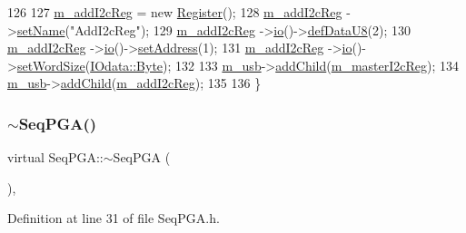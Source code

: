\begin{DoxyCode}
126 
127   \hyperlink{classSeqPGA_ac3a6aad3fec65ceb78528b6d20deeb3f}{m\_addI2cReg}       = \textcolor{keyword}{new} \hyperlink{classRegister}{Register}();
128   \hyperlink{classSeqPGA_ac3a6aad3fec65ceb78528b6d20deeb3f}{m\_addI2cReg}       ->\hyperlink{classObject_ae30fea75683c2d149b6b6d17c09ecd0c}{setName}(\textcolor{stringliteral}{"AddI2cReg"});
129   \hyperlink{classSeqPGA_ac3a6aad3fec65ceb78528b6d20deeb3f}{m\_addI2cReg}       ->\hyperlink{classIOobject_af04fb94137c3d86849f478ac5afab5d1}{io}()->\hyperlink{classIOdata_a80bb230b61062b447db5832e43bf7b44}{defDataU8}(2);
130   \hyperlink{classSeqPGA_ac3a6aad3fec65ceb78528b6d20deeb3f}{m\_addI2cReg}       ->\hyperlink{classIOobject_af04fb94137c3d86849f478ac5afab5d1}{io}()->\hyperlink{classIOdata_af98cbfbc28346ebb9b64ca0203af1463}{setAddress}(1);
131   \hyperlink{classSeqPGA_ac3a6aad3fec65ceb78528b6d20deeb3f}{m\_addI2cReg}       ->\hyperlink{classIOobject_af04fb94137c3d86849f478ac5afab5d1}{io}()->\hyperlink{classIOdata_a20f30a9f4673713616447b1b5e9817d5}{setWordSize}(\hyperlink{classIOdata_a37c53ebf4bf8d866aac8af572962a84ca00156611f08eeb1b5d361de809dafb8e}{IOdata::Byte});
132 
133   \hyperlink{classSeqPGA_a3df81bbe0e75a1287aa6fe9d33ea27f5}{m\_usb}->\hyperlink{classHierarchy_ad677774ff38fcb257c04a3a10d471fac}{addChild}(\hyperlink{classSeqPGA_a942c71b33a4f43b7a994cb9216abb17e}{m\_masterI2cReg});  
134   \hyperlink{classSeqPGA_a3df81bbe0e75a1287aa6fe9d33ea27f5}{m\_usb}->\hyperlink{classHierarchy_ad677774ff38fcb257c04a3a10d471fac}{addChild}(\hyperlink{classSeqPGA_ac3a6aad3fec65ceb78528b6d20deeb3f}{m\_addI2cReg});     
135 
136 \}
\end{DoxyCode}
\mbox{\label{classSeqPGA_ac36a18cf2f56796a78fb91a1afc5cc1b}} 
\subsubsection{\texorpdfstring{$\sim$\+Seq\+P\+G\+A()}{~SeqPGA()}}
{\footnotesize\ttfamily virtual Seq\+P\+G\+A\+::$\sim$\+Seq\+P\+GA (\begin{DoxyParamCaption}{ }\end{DoxyParamCaption})\hspace{0.3cm}{\ttfamily [inline]}, {\ttfamily [virtual]}}



Definition at line 31 of file Seq\+P\+G\+A.\+h.


